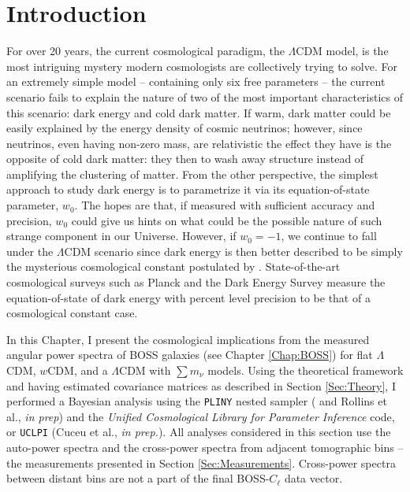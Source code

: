 \section{Introduction}
For over 20 years, the current cosmological paradigm, the $\Lambda$CDM model, is the most intriguing mystery modern cosmologists are collectively trying to solve. For an extremely simple model -- containing only six free parameters -- the current scenario fails to explain the nature of two of the most important characteristics of this scenario: dark energy and cold dark matter. If warm, dark matter could be easily explained by the energy density of cosmic neutrinos; however, since neutrinos, even having non-zero mass, are relativistic the effect they have is the opposite of cold dark matter: they then to wash away structure instead of amplifying the clustering of matter. From the other perspective, the simplest approach to study dark energy is to parametrize it via its equation-of-state parameter, $w_0$. The hopes are that, if measured with sufficient accuracy and precision, $w_0$ could give us hints on what could be the possible nature of such strange component in our Universe. However, if $w_0 = -1$, we continue to fall under the $\Lambda$CDM scenario since dark energy is then better described to be simply the mysterious cosmological constant postulated by \cite{1917Einstein}. State-of-the-art cosmological surveys such as Planck \citep{PlanckCosmology2016,2018PlanckCosmology} and the Dark Energy Survey \citep{2017arXiv170801530D,2018DES-SNe} measure the equation-of-state of dark energy with percent level precision to be that of a cosmological constant case.

\qquad In this Chapter, I present the cosmological implications from the measured angular power spectra of BOSS galaxies (see Chapter \ref{Chap:BOSS}) for flat $\Lambda$CDM, $w$CDM, and a $\Lambda$CDM with $\sum m_{\nu}$ models. Using the theoretical framework and having estimated covariance matrices as described in Section \ref{Sec:Theory}, I performed a Bayesian analysis using the \texttt{PLINY} nested sampler ( \citealt{PlinyRichardThesis} and Rollins et al., \textit{in prep}) and the \textit{Unified Cosmological Library for Parameter Inference} code, or \texttt{UCLPI} (Cuceu et al., \textit{in prep.}). All analyses considered in this section use the auto-power spectra and the cross-power spectra from adjacent tomographic bins -- the measurements presented in Section \ref{Sec:Measurements}. Cross-power spectra between distant bins are not a part of the final BOSS-$C_{\ell}$ data vector.

